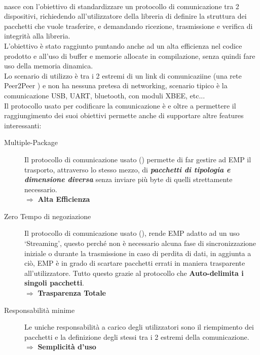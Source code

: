 \paragraph{\cite*{EMP}} nasce con l’obiettivo di standardizzare un protocollo di comunicazione tra 2 dispositivi, richiedendo all'utilizzatore della libreria di definire la struttura dei pacchetti che vuole trasferire, e demandando ricezione, trasmissione e verifica di integrità alla libreria.\\
L'obiettivo è stato raggiunto puntando anche ad un alta efficienza nel codice prodotto e all'uso di buffer e memorie allocate in compilazione, senza quindi fare uso della memoria dinamica.\\
Lo scenario di utilizzo è tra i 2 estremi di un link di comunicaziine (una rete Peer2Peer ) e non ha nessuna pretesa di networking, scenario tipico è la comunicazione USB, UART, bluetooth, con moduli XBEE, etc...\\
Il protocollo usato per codificare la comunicazione è \cite{COBS} e oltre a permettere il raggiungimento dei suoi obiettivi permette anche di supportare altre features interessanti:
\begin{spacing}{1.25}
	\begin{description}
		\item[Multiple-Package] Il protocollo di comunicazione usato (\cite{COBS}) permette di far gestire ad EMP il trasporto, attraverso lo stesso mezzo, di \textit{\textbf{pacchetti di tipologia e dimensione diversa}} senza inviare più byte di quelli strettamente necessario.\\
		      $\Rightarrow$ \textbf{Alta Efficienza}
		\item[Zero Tempo di negoziazione] Il protocollo di comunicazione usato (\cite{COBS}), rende EMP adatto ad un uso ‘Streaming’, questo perché non è necessario alcuna fase di sincronizzazione iniziale o durante la trasmissione in caso di perdita di dati, in aggiunta a ciò, EMP è in grado di scartare pacchetti errati in maniera trasparente all’utilizzatore. Tutto questo grazie al protocollo che \textbf{Auto-delimita i singoli pacchetti}.\\
		      $\Rightarrow$ \textbf{Trasparenza Totale}
		\item[Responsabilità minime] Le uniche responsabilità a carico degli utilizzatori sono il riempimento dei pacchetti e la definizione degli stessi tra i 2 estremi della comunicazione.\\
		      $\Rightarrow$ \textbf{Semplicità d'uso}
	\end{description}
\end{spacing}

